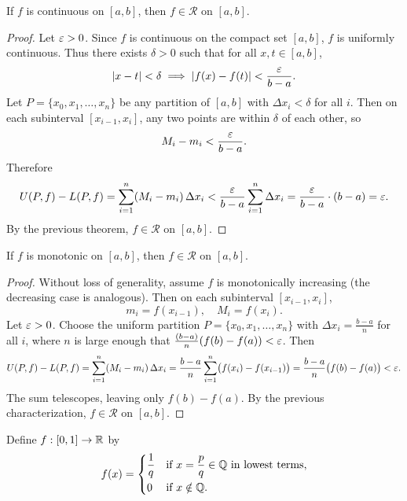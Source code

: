 \documentclass[../master/master.tex]{subfiles}
\begin{document}
\begin{theorem}
If $f$ is continuous on $[a,b]$, then $f \in \mathscr{R}$ on $[a,b]$.
\end{theorem}

\begin{proof}
Let $\varepsilon > 0$. Since $f$ is continuous on the compact set $[a,b]$, $f$ is uniformly continuous. Thus there exists $\delta > 0$ such that for all $x, t \in [a,b]$,
\[
|x - t| < \delta \implies |f(x) - f(t)| < \frac{\varepsilon}{b - a}.
\]
Let $P = \{x_0, x_1, \dots, x_n\}$ be any partition of $[a,b]$ with $\Delta x_i < \delta$ for all $i$. Then on each subinterval $[x_{i-1}, x_i]$, any two points are within $\delta$ of each other, so
\[
M_i - m_i < \frac{\varepsilon}{b - a}.
\]
Therefore
\[
U(P, f) - L(P, f) = \sum_{i=1}^{n} (M_i - m_i) \, \Delta x_i < \frac{\varepsilon}{b - a} \sum_{i=1}^{n} \Delta x_i = \frac{\varepsilon}{b - a} \cdot (b - a) = \varepsilon.
\]
By the previous theorem, $f \in \mathscr{R}$ on $[a,b]$.
\end{proof}

\begin{theorem}
If $f$ is monotonic on $[a,b]$, then $f \in \mathscr{R}$ on $[a,b]$.
\end{theorem}

\begin{proof}
Without loss of generality, assume $f$ is monotonically increasing (the decreasing case is analogous). Then on each subinterval $[x_{i-1}, x_i]$,
\[
m_i = f(x_{i-1}), \quad M_i = f(x_i).
\]
Let $\varepsilon > 0$. Choose the uniform partition $P = \{x_0, x_1, \dots, x_n\}$ with $\Delta x_i = \frac{b-a}{n}$ for all $i$, where $n$ is large enough that $\frac{(b-a)}{n}(f(b) - f(a)) < \varepsilon$. Then
\[
U(P,f) - L(P,f) = \sum_{i=1}^{n} (M_i - m_i)\,\Delta x_i = \frac{b-a}{n} \sum_{i=1}^{n} \bigl(f(x_i) - f(x_{i-1})\bigr) = \frac{b-a}{n}\bigl(f(b) - f(a)\bigr) < \varepsilon.
\]
The sum telescopes, leaving only $f(b) - f(a)$. By the previous characterization, $f \in \mathscr{R}$ on $[a,b]$.
\end{proof}

\begin{example}
Define $f: [0,1] \to \mathbb{R}$ by
\[
f(x) = \begin{cases} \dfrac{1}{q} & \text{if } x = \dfrac{p}{q} \in \mathbb{Q} \text{ in lowest terms}, \\[6pt] 0 & \text{if } x \notin \mathbb{Q}. \end{cases}
\]
\end{example}
\end{document}
